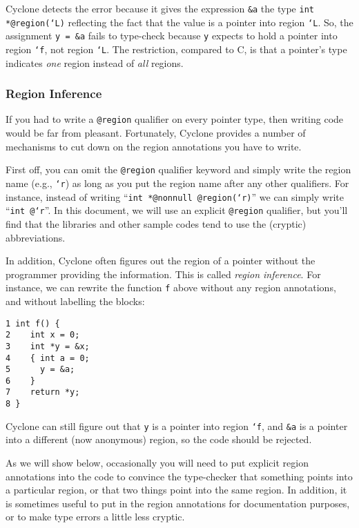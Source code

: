 Cyclone detects the error because it gives the expression \texttt{\&a} the
type \texttt{int *@region(`L)} reflecting the fact that the value is
a pointer into region \texttt{`L}.  So, the assignment 
\texttt{y = \&a} fails to type-check because \texttt{y} expects
to hold a pointer into region \texttt{`f}, not region \texttt{`L}.
The restriction, compared to C, is that a pointer's type indicates
\emph{one} region instead of \emph{all} regions.

\subsubsection*{Region Inference}

If you had to write a \texttt{@region} qualifier on every
pointer type, then writing code would be far from pleasant.
Fortunately, Cyclone provides a number of mechanisms to
cut down on the region annotations you have to write.  

First off, you can omit the \texttt{@region} qualifier keyword
and simply write the region name (e.g., \texttt{`r}) as long
as you put the region name after any other qualifiers.  For
instance, instead of writing ``\texttt{int *@nonnull @region(`r)}''
we can simply write ``\texttt{int @`r}''.  In this document,
we will use an explicit \texttt{@region} qualifier, but
you'll find that the libraries and other sample codes tend
to use the (cryptic) abbreviations.  

In addition, Cyclone often figures out the region of a pointer
without the programmer providing the information.  This is called {\em
region inference}.  For instance, we can rewrite the function
\texttt{f} above without any region annotations, and without 
labelling the blocks:
\begin{verbatim}
1 int f() {
2    int x = 0;
3    int *y = &x;
4    { int a = 0;
5      y = &a;
6    }
7    return *y;
8 }
\end{verbatim}
Cyclone can still figure out that \texttt{y} is a pointer into
region \texttt{`f}, and \texttt{\&a} is a pointer into a different
(now anonymous) region, so the code should be rejected.

As we will show below, occasionally you will need to put explicit
region annotations into the code to convince the type-checker that
something points into a particular region, or that two things point
into the same region.  In addition, it is sometimes useful to put in
the region annotations for documentation purposes, or to make type
errors a little less cryptic.

